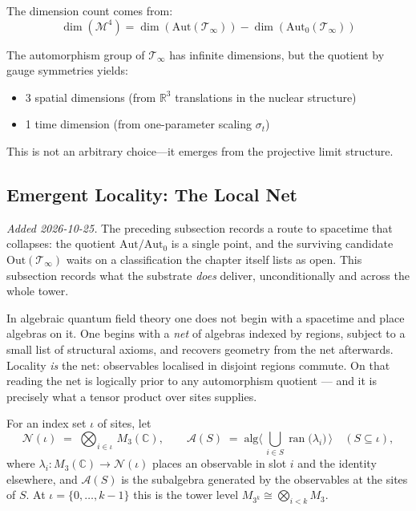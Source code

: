 \begin{level2}
The dimension count comes from:
\begin{equation}
\dim(\mathcal{M}^4) = \dim(\text{Aut}(\mathcal{T}_\infty)) - \dim(\text{Aut}_0(\mathcal{T}_\infty))
\end{equation}

The automorphism group of $\mathcal{T}_\infty$ has infinite dimensions, but the quotient by gauge symmetries yields:
\begin{itemize}
\item 3 spatial dimensions (from $\mathbb{R}^3$ translations in the nuclear structure)
\item 1 time dimension (from one-parameter scaling $\sigma_t$)
\end{itemize}

This is not an arbitrary choice—it emerges from the projective limit structure\cite{connes_noncommutative_1994}.
\end{level2}

\subsection{Emergent Locality: The Local Net}
\label{sec:emergent-locality}

\emph{Added 2026-10-25.} The preceding subsection records a route to spacetime
that collapses: the quotient $\text{Aut}/\text{Aut}_0$ is a single point, and
the surviving candidate $\text{Out}(\mathcal{T}_\infty)$ waits on a
classification the chapter itself lists as open. This subsection records what
the substrate \emph{does} deliver, unconditionally and across the whole tower.

In algebraic quantum field theory one does not begin with a spacetime and place
algebras on it. One begins with a \emph{net} of algebras indexed by regions,
subject to a small list of structural axioms, and recovers geometry from the
net afterwards. Locality \emph{is} the net: observables localised in disjoint
regions commute. On that reading the net is logically prior to any automorphism
quotient --- and it is precisely what a tensor product over sites supplies.

\begin{defn}\label{defn:ternary-net}
For an index set $\iota$ of sites, let
\begin{equation}
\mathcal{N}(\iota) \;=\; \bigotimes_{i \in \iota}\, M_3(\mathbb{C}),
\qquad
\mathcal{A}(S) \;=\; \text{alg}\Big\langle\, \textstyle\bigcup_{i \in S}
  \operatorname{ran}\big(\lambda_i\big) \,\Big\rangle
  \quad (S \subseteq \iota),
\end{equation}
where $\lambda_i : M_3(\mathbb{C}) \to \mathcal{N}(\iota)$ places an observable
in slot $i$ and the identity elsewhere, and $\mathcal{A}(S)$ is the subalgebra
generated by the observables at the sites of $S$. At $\iota = \{0,\dots,k-1\}$
this is the tower level $M_{3^k} \cong \bigotimes_{i<k} M_3$.
\end{defn}

